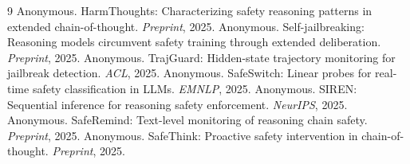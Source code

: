 \documentclass[11pt]{article}
\begin{document}

\begin{thebibliography}{9}
 Anonymous. HarmThoughts: Characterizing safety reasoning patterns in extended chain-of-thought. \emph{Preprint}, 2025.
 Anonymous. Self-jailbreaking: Reasoning models circumvent safety training through extended deliberation. \emph{Preprint}, 2025.
 Anonymous. TrajGuard: Hidden-state trajectory monitoring for jailbreak detection. \emph{ACL}, 2025.
 Anonymous. SafeSwitch: Linear probes for real-time safety classification in LLMs. \emph{EMNLP}, 2025.
 Anonymous. SIREN: Sequential inference for reasoning safety enforcement. \emph{NeurIPS}, 2025.
 Anonymous. SafeRemind: Text-level monitoring of reasoning chain safety. \emph{Preprint}, 2025.
 Anonymous. SafeThink: Proactive safety intervention in chain-of-thought. \emph{Preprint}, 2025.
\end{thebibliography}
\end{document}
